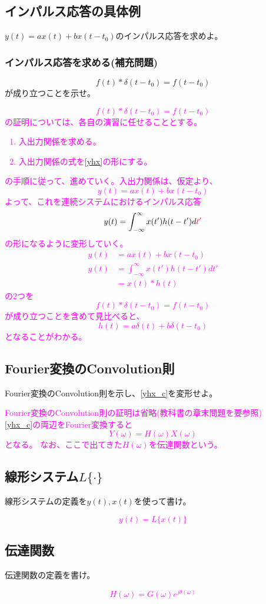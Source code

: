 \documentclass[twocolumn]{ltjsarticle}
\newcommand{\visible}{visible}
\newcommand{\ans}[1]{
\begin{tcolorbox}[\visible]
\textcolor{magenta}{#1}
\end{tcolorbox}
}
\begin{document}
\subsection{インパルス応答の具体例}
$y(t)=ax(t)+bx(t-t_0)$のインパルス応答を求めよ。
\subsubsection{インパルス応答を求める(補充問題)}
$$f(t)*\delta(t-t_0)=f(t-t_0)$$が成り立つことを示せ。
\ans{
    $$f(t)*\delta(t-t_0)=f(t-t_0)$$
    の証明については、各自の演習に任せることとする。
    \begin{enumerate}
        \item 入出力関係を求める。
        \item 入出力関係の式を\ref{yhx}の形にする。
    \end{enumerate}
    の手順に従って、進めていく。入出力関係は、仮定より、
    $$y(t)=ax(t)+bx(t-t_0)$$
    よって、これを連続システムにおけるインパルス応答
    $$y(t)=\int_{-\infty}^{\infty}x(t')h(t-t')d\textcolor{red}{t'}$$
    の形になるように変形していく。
    \begin{align*}
        y(t)&=ax(t)+bx(t-t_0)\\
        y(t)&=\int_{-\infty}^{\infty}x(t')h(t-t')dt'\\
        &=x(t)*h(t)
    \end{align*}
    の2つを
    $$f(t)*\delta(t-t_0)=f(t-t_0)$$
    が成り立つことを含めて見比べると、
    $$h(t)=a\delta(t)+b\delta(t-t_0)$$
    となることがわかる。
}

\subsection{Fourier変換のConvolution則}\label{YHX}
Fourier変換のConvolution則を示し、\ref{yhx_c}を変形せよ。
\ans{Fourier変換のConvolution則の証明は省略(教科書の章末問題を要参照)\\
\ref{yhx_c}の両辺をFourier変換すると
$$Y(\omega)=H(\omega)X(\omega)$$
となる。
なお、ここで出てきた$H(\omega)$を伝達関数という。
}
\subsection{線形システム$L\{\cdot\}$}\label{yLx}
線形システムの定義を$y(t),x(t)$を使って書け。
\ans{
    $$y(t)=L\{x(t)\}$$
}
\subsection{伝達関数}\label{H}
伝達関数の定義を書け。
\ans{
    $$H(\omega)=G(\omega)e^{j\theta(\omega)}$$
}
\end{document}
